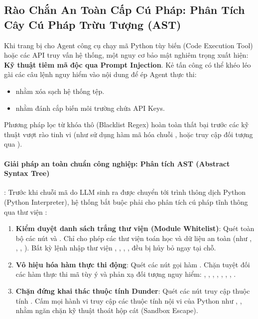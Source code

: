 \subsection{Rào Chắn An Toàn Cấp Cú Pháp: Phân Tích Cây Cú Pháp Trừu Tượng (AST)}
\label{sec:ast-tool-security}

Khi trang bị cho Agent công cụ chạy mã Python tùy biến (Code Execution Tool) hoặc các API truy vấn hệ thống, một nguy cơ bảo mật nghiêm trọng xuất hiện: \textbf{Kỹ thuật tiêm mã độc qua Prompt Injection}.
Kẻ tấn công có thể khéo léo gài các câu lệnh nguy hiểm vào nội dung để ép Agent thực thi:
\begin{itemize}
  \item {} nhằm xóa sạch hệ thống tệp.
  \item {} nhằm đánh cắp biến môi trường chứa API Keys.
\end{itemize}

Phương pháp lọc từ khóa thô (Blacklist Regex) hoàn toàn thất bại trước các kỹ thuật vượt rào tinh vi (như sử dụng hàm mã hóa chuỗi , hoặc truy cập đối tượng qua ).

\paragraph{Giải pháp an toàn chuẩn công nghiệp: Phân tích AST (Abstract Syntax Tree)}:
Trước khi chuỗi mã do LLM sinh ra được chuyển tới trình thông dịch Python (Python Interpreter), hệ thống bắt buộc phải cho phân tích cú pháp tĩnh thông qua thư viện :
\begin{enumerate}
  \item \textbf{Kiểm duyệt danh sách trắng thư viện (Module Whitelist)}: Quét toàn bộ các nút  và . Chỉ cho phép các thư viện toán học và dữ liệu an toàn (như , , , ). Bất kỳ lệnh nhập thư viện , , , ,  đều bị hủy bỏ ngay tại chỗ.
  \item \textbf{Vô hiệu hóa hàm thực thi động}: Quét các nút gọi hàm . Chặn tuyệt đối các hàm thực thi mã tùy ý và phản xạ đối tượng nguy hiểm: , , , , , , , .
  \item \textbf{Chặn đứng khai thác thuộc tính Dunder}: Quét các nút truy cập thuộc tính . Cấm mọi hành vi truy cập các thuộc tính nội vi của Python như , ,  nhằm ngăn chặn kỹ thuật thoát hộp cát (Sandbox Escape).
\end{enumerate}


